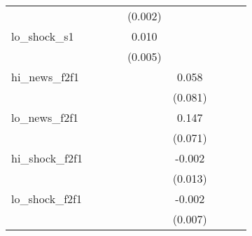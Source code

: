 {\begin{tabular}{l*{8}{c}}
            &                     &                     &                     &     (0.002)         &                     &                     &                     &                     \\
\addlinespace
lo\_shock\_s1 &                     &                     &                     &       0.010\sym{**} &                     &                     &                     &                     \\
            &                     &                     &                     &     (0.005)         &                     &                     &                     &                     \\
\addlinespace
hi\_news\_f2f1&                     &                     &                     &                     &       0.058         &                     &                     &                     \\
            &                     &                     &                     &                     &     (0.081)         &                     &                     &                     \\
\addlinespace
lo\_news\_f2f1&                     &                     &                     &                     &       0.147\sym{**} &                     &                     &                     \\
            &                     &                     &                     &                     &     (0.071)         &                     &                     &                     \\
\addlinespace
hi\_shock\_f2f1&                     &                     &                     &                     &      -0.002         &                     &                     &                     \\
            &                     &                     &                     &                     &     (0.013)         &                     &                     &                     \\
\addlinespace
lo\_shock\_f2f1&                     &                     &                     &                     &      -0.002         &                     &                     &                     \\
            &                     &                     &                     &                     &     (0.007)         &                     &                     &                     \\

\end{tabular}}
